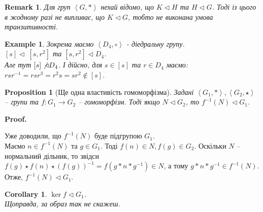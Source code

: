 \documentclass[a4paper, 10pt]{article}
\makeatletter
\theoremstyle{theoremdd}
\theoremstyle{theoremdd}
\theoremstyle{theoremdd}
\theoremstyle{theoremdd}
\theoremstyle{theoremdd}
\newtheorem{example}[theorem]{Example}
\theoremstyle{theoremdd}
\theoremstyle{theoremdd}
\theoremstyle{theoremdd}
\theoremstyle{theoremdd}
\newtheorem{proposition}[theorem]{Proposition}
\theoremstyle{theoremdd}
\theoremstyle{theoremdd}
\newtheorem{remark}[theorem]{Remark}
\theoremstyle{theoremdd}
\theoremstyle{theoremdd}
\theoremstyle{theoremdd}
\newtheorem{corollary}[theorem]{Corollary}
\theoremstyle{theoremdd}
\renewenvironment{proof}[1][Proof.\\]{\par
\pushQED{\hfill \qed}%
\normalfont \topsep6\p@\@plus6\p@\relax
\trivlist
\item\relax
{\bfseries
#1\@addpunct{.}}\hspace\labelsep\ignorespaces
}{%
\popQED\endtrivlist\@endpefalse
}
\makeatother
\begin{document}
\begin{remark}
Для груп $\left< G, * \right>$ нехай відомо, що $K \triangleleft H$ та $H \triangleleft G$. Тоді із цього в жодному разі не випливає, що $K \triangleleft G$, тобто не виконана умова транзитивності.
\end{remark}

\begin{example}
Зокрема маємо $\left< D_4, \circ \right>$ - діедральну групу. \\
$[s] \triangleleft \ [s,r^2]$ та $[s,r^2] \triangleleft D_4$.\\
Але тут $[s] \not\triangleleft D_4$. І дійсно, для $s \in [s]$ та $r \in D_4$ маємо:\\
$rsr^{-1} = rsr^3 = r^2s = sr^2 \not\in [s]$.
\end{example}

\begin{proposition}[Ще одна властивість гомоморфізма]
Задані $\left<G_1, * \right>,\left<G_2, \star \right>$ -- групи та $f \colon G_1 \to G_2$ -- гомоморфізм. Тоді якщо $N \triangleleft G_2$, то $f^{-1}(N) \triangleleft G_1$.
\end{proposition}

\begin{proof}
Уже доводили, що $f^{-1}(N)$ буде підгрупою $G_1$.\\
Маємо $n \in f^{-1}(N)$ та $g \in G_1$. Тоді $f(n) \in N, f(g) \in G_2$. Оскільки $N$ -- нормальний дільник, то звідси $f(g) \star f(n) \star (f(g))^{-1} = f(g*n*g^{-1}) \in N$, а тому $g*n*g^{-1} \in f^{-1}(N)$.\\
Отже, $f^{-1}(N) \triangleleft G_1$.
\end{proof}

\begin{corollary}
$\ker f \triangleleft G_1$.\\
\textit{Щоправда, за образ так не скажеш.}
\end{corollary}
\end{document}
